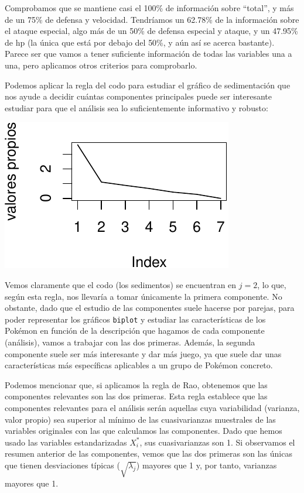 \documentclass[
  11.8pt,
]{extreport}
\begin{document}
Comprobamos que se mantiene casi el 100\% de información sobre
``total'', y más de un 75\% de defensa y velocidad. Tendríamos un
62.78\% de la información sobre el ataque especial, algo más de un 50\%
de defensa especial y ataque, y un 47.95\% de hp (la única que está por
debajo del 50\%, y aún así se acerca bastante). Parece ser que vamos a
tener suficiente información de todas las variables una a una, pero
aplicamos otros criterios para comprobarlo.

Podemos aplicar la regla del codo para estudiar el gráfico de
sedimentación que nos ayude a decidir cuántas componentes principales
puede ser interesante estudiar para que el análisis sea lo
suficientemente informativo y robusto:

\begin{center}
\includegraphics{trabajo_files/figure-pdf/unnamed-chunk-25-1.pdf}
\end{center}

Vemos claramente que el codo (los sedimentos) se encuentran en
\(j = 2\), lo que, según esta regla, nos llevaría a tomar únicamente la
primera componente. No obstante, dado que el estudio de las componentes
suele hacerse por parejas, para poder representar los gráficos
\texttt{biplot} y estudiar las características de los Pokémon en función
de la descripción que hagamos de cada componente (análisis), vamos a
trabajar con las dos primeras. Además, la segunda componente suele ser
más interesante y dar más juego, ya que suele dar unas características
más específicas aplicables a un grupo de Pokémon concreto.

Podemos mencionar que, si aplicamos la regla de Rao, obtenemos que las
componentes relevantes son las dos primeras. Esta regla establece que
las componentes relevantes para el análisis serán aquellas cuya
variabilidad (varianza, valor propio) sea superior al mínimo de las
cuasivarianzas muestrales de las variables originales con las que
calculamos las componentes. Dado que hemos usado las variables
estandarizadas \(X_i^*\), sus cuasivarianzas son 1. Si observamos el
resumen anterior de las componentes, vemos que las dos primeras son las
únicas que tienen desviaciones típicas (\(\sqrt{\lambda_j}\)) mayores
que 1 y, por tanto, varianzas mayores que 1.
\end{document}
